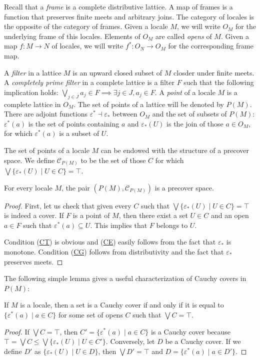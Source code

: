 \documentclass[reqno]{amsart}
\newcommand{\axref}[1]{(\hyperref[ax:#1]{#1})}
\theoremstyle{definition}
\theoremstyle{remark}
\numberwithin{figure}{section}
\begin{document}
Recall that a \emph{frame} is a complete distributive lattice.
A map of frames is a function that preserves finite meets and arbitrary joins.
The category of locales is the opposite of the category of frames.
Given a locale $M$, we will write $O_M$ for the underlying frame of this locales.
Elements of $O_M$ are called \emph{opens} of $M$.
Given a map $f : M \to N$ of locales, we will write $f^* : O_N \to O_M$ for the corresponding frame map.

A \emph{filter} in a lattice $M$ is an upward closed subset of $M$ closder under finite meets.
A \emph{completely prime filter} in a complete lattice is a filter $F$ such that the following implication holds: $\bigvee_{j \in J} a_j \in F \implies \exists j \in J, a_j \in F$.
A \emph{point} of a locale $M$ is a complete lattice in $O_M$.
The set of points of a lattice will be denoted by $P(M)$.
There are adjoint functions $\varepsilon^* \dashv \varepsilon_*$ between $O_M$ and the set of subsets of $P(M)$:
$\varepsilon^*(a)$ is the set of points containing $a$ and $\varepsilon_*(U)$ is the join of those $a \in O_M$, for which $\varepsilon^*(a)$ is a subset of $U$.

The set of points of a locale $M$ can be endowed with the structure of a precover space.
We define $\mathcal{C}_{P(M)}$ to be the set of those $C$ for which $\bigvee \{ \varepsilon_*(U) \mid U \in C \} = \top$.

\begin{prop}
For every locale $M$, the pair $(P(M),\mathcal{C}_{P(M)})$ is a precover space.
\end{prop}
\begin{proof}
First, let us check that given every $C$ such that $\bigvee \{ \varepsilon_*(U) \mid U \in C \} = \top$ is indeed a cover.
If $F$ is a point of $M$, then there exist a set $U \in C$ and an open $a \in F$ such that $\varepsilon^*(a) \subseteq U$.
This implies that $F$ belongs to $U$.

Condition \axref{CT} is obvious and \axref{CE} easily follows from the fact that $\varepsilon_*$ is monotone.
Condition \axref{CG} follows from distributivity and the fact that $\varepsilon_*$ preserves meets.
\end{proof}

The following simple lemma gives a useful characterization of Cauchy covers in $P(M)$:

\begin{lem}
If $M$ is a locale, then a set is a Cauchy cover if and only if it is equal to $\{ \varepsilon^*(a) \mid a \in C \}$ for some set of opens $C$ such that $\bigvee C = \top$.
\end{lem}
\begin{proof}
If $\bigvee C = \top$, then $C' = \{ \varepsilon^*(a) \mid a \in C \}$ is a Cauchy cover because $\top = \bigvee C \leq \bigvee \{ \varepsilon_*(U) \mid U \in C' \}$.
Conversely, let $D$ be a Cauchy cover.
If we define $D'$ as $\{ \varepsilon_*(U) \mid U \in D \}$, then $\bigvee D' = \top$ and $D = \{ \varepsilon^*(a) \mid a \in D' \}$.
\end{proof}
\end{document}
